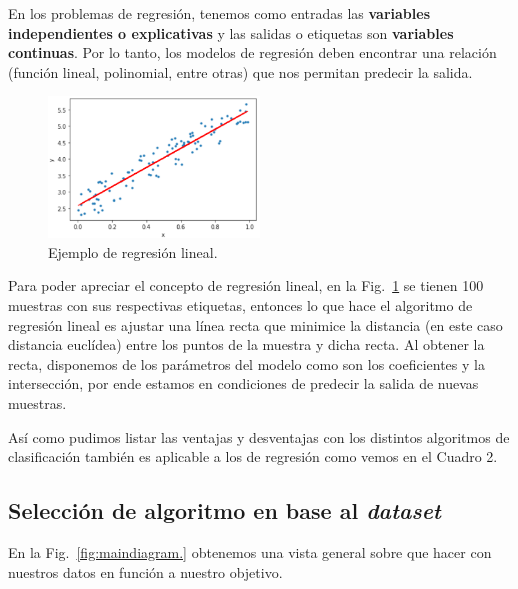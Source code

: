 \documentclass[a4paper,12pt]{article}
\begin{document}
En los problemas de regresión, tenemos como entradas las \textbf{variables independientes o explicativas} y las salidas o etiquetas son \textbf{variables continuas}. Por lo tanto, los modelos de regresión deben encontrar una relación (función lineal, polinomial, entre otras) que nos permitan predecir la salida.

\begin{figure}[H]
	\begin{center}				
		\includegraphics[width=0.5\textwidth]{tesis_9.png}
		\caption{Ejemplo de regresión lineal.}
		\label{fig:regressionlinear.}
	\end{center}
\end{figure}

Para poder apreciar el concepto de regresión lineal, en la Fig.~\ref{fig:regressionlinear.} se tienen 100 muestras con sus respectivas etiquetas, entonces lo que hace el algoritmo de regresión lineal es ajustar una línea recta que minimice la distancia (en este caso distancia euclídea) entre los puntos de la muestra y dicha recta. Al obtener la recta, disponemos de los parámetros del modelo como son los coeficientes y la intersección, por ende estamos en condiciones de predecir la salida de nuevas muestras.

Así como pudimos listar las ventajas y desventajas con los distintos algoritmos de clasificación también es aplicable a los de regresión como vemos en el Cuadro 2.



\subsection{Selección de algoritmo en base al \textit{dataset}}
En la Fig.~\ref{fig:maindiagram.} obtenemos una vista general sobre que hacer con nuestros datos en función a nuestro objetivo.
\end{document}
